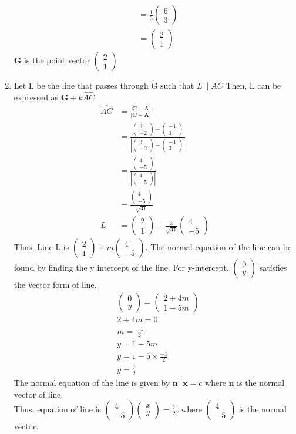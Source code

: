 \documentclass[journal,12pt,twocolumn]{IEEEtran}
\let\vec\mathbf
\providecommand{\abs}[1]{\left\vert#1\right\vert}
\newcommand{\myvec}[1]{\ensuremath{\begin{pmatrix}#1\end{pmatrix}}}
\begin{document}
\begin{enumerate}
\begin{align}
        \\
        &=\frac{1}{3}\myvec{6 \\ 3}
        \\
        &= \myvec{2 \\ 1}
    \end{align}
    $\vec{G}$ is the point vector $\myvec{2 \\ 1}$
\item Let L be the line that passes through G such that $L \parallel AC$
    Then, L can be expressed as $\vec{G} + k\hat{AC}$
    \begin{align}
        \hat{AC} &= \frac{\vec{C} - \vec{A}}{\abs{\vec{C} - \vec{A}}}
		\\        
        &= \frac{\myvec{3 \\ -2} - \myvec{-1 \\ 3}}{\abs{\myvec{3 \\ -2} - \myvec{-1 \\ 3}}}
        \\
        &= \frac{\myvec{4 \\ -5}}{\abs{\myvec{4 \\ -5}}}
		\\        
        &= \frac{\myvec{4 \\ -5}}{\sqrt{41}}
        \\
        L &= \myvec{2 \\ 1} + \frac{k}{\sqrt{41}}\myvec{4 \\ -5}
    \end{align}
    Thus, Line L is $\myvec{2 \\ 1} + m\myvec{4 \\ -5}$.
    The normal equation of the line can be found by finding the y intercept of the line.
    For y-intercept, $\myvec{0 \\ y}$ satisfies the vector form of line.
    \begin{align}
    		&\myvec{0 \\ y} = \myvec{2 + 4m \\ 1 - 5m}
    		\\
    		&2+4m = 0
    		\\
    		&m = \frac{-1}{2} 
    		\\
    		&y = 1 - 5m
    		\\
    		&y = 1 - 5 \times \frac{-1}{2}
    		\\
    		&y = \frac{7}{2}
    \end{align}
    The normal equation of the line is given by $\vec{n}^{\top}\vec{x} = c $ where $\vec{n}$ is the normal vector of line. \\
    Thus, equation of line is $\myvec{4 \\ -5}\myvec{x \\ y} = \frac{7}{2}$, where $\myvec{4 \\ -5}$ is the normal vector.
\end{enumerate}
\end{document}
